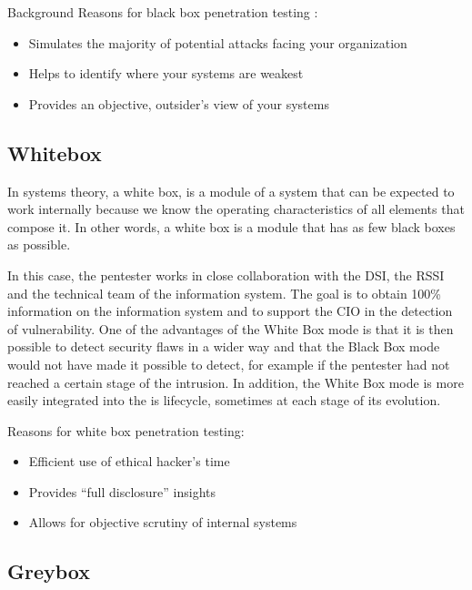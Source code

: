 \begin{chaptercover}{Background}
Reasons for black box penetration testing :

\begin{itemize} \vspace{-.2cm}
  \item[\checkmark] Simulates the majority of potential attacks facing your organization
  \item[\checkmark] Helps to identify where your systems are weakest
  \item[\checkmark] Provides an objective, outsider’s view of your systems
\end{itemize}

\subsection{Whitebox}

In systems theory, a white box, is a module of a system that can be expected to work internally because we know the operating characteristics of all elements that compose it. In other words, a white box is a module that has as few black boxes as possible.

In this case, the pentester works in close collaboration with the DSI, the RSSI and the technical team of the information system. The goal is to obtain 100\% information on the information system and to support the CIO in the detection of vulnerability. One of the advantages of the White Box mode is that it is then possible to detect security flaws in a wider way and that the Black Box mode would not have made it possible to detect, for example if the pentester had not reached a certain stage of the intrusion. In addition, the White Box mode is more easily integrated into the \acrshort{is} lifecycle, sometimes at each stage of its evolution.

Reasons for white box penetration testing:
\begin{itemize} \vspace{-.2cm}
  \item[\checkmark] Efficient use of ethical hacker’s time
  \item[\checkmark] Provides “full disclosure” insights
  \item[\checkmark] Allows for objective scrutiny of internal systems
\end{itemize}

\subsection{Greybox}


\end{chaptercover}
